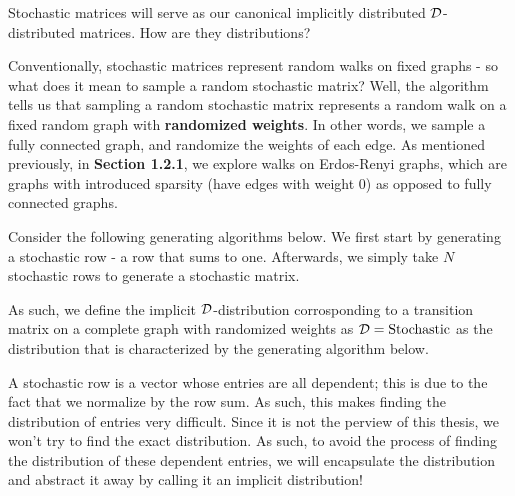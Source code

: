 %
%


Stochastic matrices will serve as our canonical implicitly distributed $\mathcal{D}$-distributed matrices. How are they distributions?

Conventionally, stochastic matrices represent random walks on fixed graphs - so what does it mean to sample a random stochastic matrix?
Well, the algorithm tells us that sampling a random stochastic matrix represents a random walk on a fixed random graph with \textbf{randomized weights}.
In other words, we sample a fully connected graph, and randomize the weights of each edge. As mentioned previously, in \textbf{Section 1.2.1}, we explore walks on Erdos-Renyi graphs,
which are graphs with introduced sparsity (have edges with weight 0) as opposed to fully connected graphs.

Consider the following generating algorithms below. We first start by generating a stochastic row - a row that sums to one. Afterwards, we simply take $N$ stochastic rows to generate a stochastic matrix.

\ALGstochrow

As such, we define the implicit $\mathcal{D}$-distribution corrosponding to a transition matrix on a complete graph with randomized weights as $\mathcal{D} = \text{Stochastic}$ as the distribution that
is characterized by the generating algorithm below.

\ALGstoch

\begin{remark}
A stochastic row is a vector whose entries are all dependent; this is due to the fact that we normalize by the row sum.
As such, this makes finding the distribution of entries very difficult. Since it is not the perview of this thesis, we won't try to find the exact distribution.
As such, to avoid the process of finding the distribution of these dependent entries, we will encapsulate the distribution and abstract it away by calling it an implicit distribution!
\end{remark}

